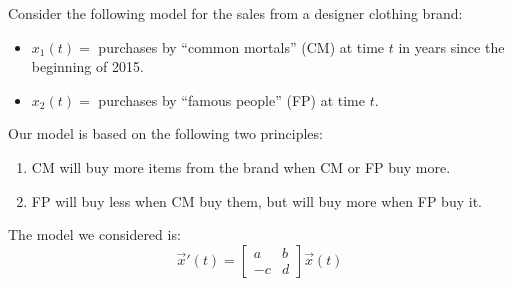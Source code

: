 \begin{lesson}
%
%	

\end{lesson}




\question
	Consider the following model for the sales from a designer clothing brand:
	\begin{itemize}
	\item $x_1(t) = $ purchases by ``common mortals'' (CM) at time $t$ in years since the beginning of 2015.
	\item $x_2(t) = $ purchases by ``famous people'' (FP) at time $t$.
	\end{itemize}
	
	Our model is based on the following two principles:
	\begin{enumerate}[label={($P_{\arabic*}$)}]
		\item CM will buy more items from the brand when CM or FP buy more.
		\item FP will buy less when CM buy them, but will buy more when FP buy it.
	\end{enumerate}

	The model we considered is:
	$$
	\vec{x}'(t) = 
	\begin{bmatrix}
 		a & b \\
 		-c & d
	\end{bmatrix}
	\vec{x}(t)
	$$
	
